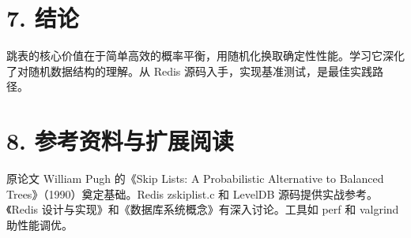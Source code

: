 \chapter{7. 结论}
跳表的核心价值在于简单高效的概率平衡，用随机化换取确定性性能。学习它深化了对随机数据结构的理解。从 Redis 源码入手，实现基准测试，是最佳实践路径。\par
\chapter{8. 参考资料与扩展阅读}
原论文 William Pugh 的《Skip Lists: A Probabilistic Alternative to Balanced Trees》（1990）奠定基础。Redis zskiplist.c 和 LevelDB 源码提供实战参考。《Redis 设计与实现》和《数据库系统概念》有深入讨论。工具如 perf 和 valgrind 助性能调优。\par
